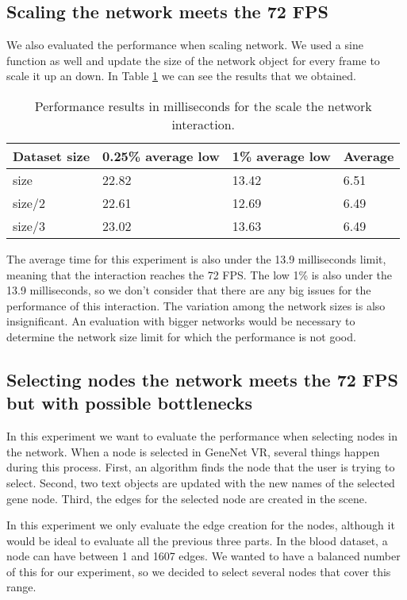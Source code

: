 \subsection{Scaling the network meets the 72 FPS}
We also evaluated the performance when scaling network. We used a sine function as well and update the size of the network object for every frame to scale it up an down. In Table \ref{tab:experiment_scale} we can see the results that we obtained.

\begin{table}[h!]
\centering
\begin{tabular}{llll}
\hline
Dataset size & 0.25\% average low & 1\% average low & Average \\
\hline
size & 22.82 & 13.42 & 6.51 \\
size/2 & 22.61 & 12.69 & 6.49 \\
size/3 & 23.02 & 13.63 & 6.49 \\
\end{tabular}
\caption{Performance results in milliseconds for the scale the network interaction.}
\label{tab:experiment_scale}
\end{table}

The average time for this experiment is also under the 13.9 milliseconds limit, meaning that the interaction reaches the 72 FPS. The low 1\% is also under the 13.9 milliseconds, so we don't consider that there are any big issues for the performance of this interaction. The variation among the network sizes is also insignificant. An evaluation with bigger networks would be necessary to determine the network size limit for which the performance is not good.

\subsection{Selecting nodes the network meets the 72 FPS but with possible bottlenecks}
In this experiment we want to evaluate the performance when selecting nodes in the network. When a node is selected in GeneNet VR, several things happen during this process. First, an algorithm finds the node that the user is trying to select. Second, two text objects are updated with the new names of the selected gene node. Third, the edges for the selected node are created in the scene.

In this experiment we only evaluate the edge creation for the nodes, although it would be ideal to evaluate all the previous three parts. In the blood dataset, a node can have between 1 and 1607 edges. We wanted to have a balanced number of this for our experiment, so we decided to select several nodes that cover this range.


